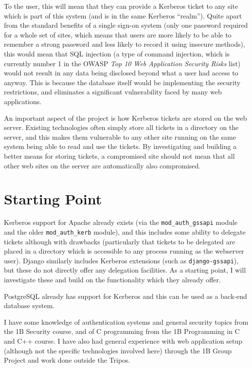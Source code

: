 \documentclass{article}
\begin{document}
To the user, this will mean that they can provide a Kerberos ticket to any site which is part of this system (and is in the same Kerberos ``realm''). Quite apart from the standard benefits of a single sign-on system (only one password required for a whole set of sites, which means that users are more likely to be able to remember a strong password and less likely to record it using insecure methods), this would mean that SQL injection (a type of command injection, which is currently number 1 in the OWASP \textit{Top 10 Web Application Security Risks} list) would not result in any data being disclosed beyond what a user had access to anyway. This is because the database itself would be implementing the security restrictions, and eliminates a significant vulnerability faced by many web applications.

An important aspect of the project is how Kerberos tickets are stored on the web server. Existing technologies often simply store all tickets in a directory on the server, and this makes them vulnerable to any other site running on the same system being able to read and use the tickets. By investigating and building a better means for storing tickets, a compromised site should not mean that all other web sites on the server are automatically also compromised.

\section*{Starting Point}
Kerberos support for Apache already exists (via the \verb+mod_auth_gssapi+ module and the older \verb+mod_auth_kerb+ module), and this includes some ability to delegate tickets although with drawbacks (particularly that tickets to be delegated are placed in a directory which is accessible to any process running as the webserver user). Django similarly includes Kerberos extensions (such as \verb+django-gssapi+), but these do not directly offer any delegation facilities. As a starting point, I will investigate these and build on the functionality which they already offer.

PostgreSQL already has support for Kerberos and this can be used as a back-end database system.

I have some knowledge of authentication systems and general security topics from the 1B Security course, and of C programming from the 1B Programming in C and C++ course. I have also had general experience with web application setup (although not the specific technologies involved here) through the 1B Group Project and work done outside the Tripos.
\end{document}
